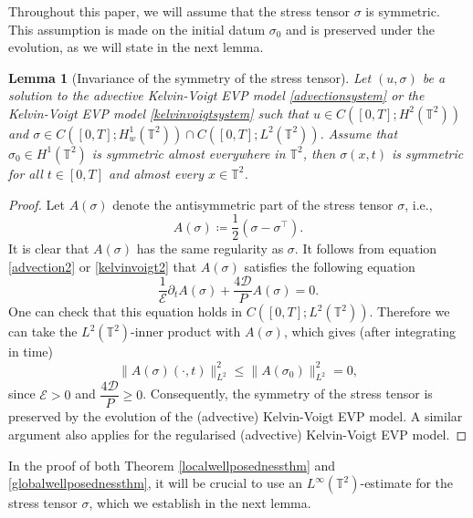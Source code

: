 \documentclass[12pt,a4paper]{article}
\newtheorem{lemma}[theorem]{Lemma}
\theoremstyle{definition}
\theoremstyle{remark}
\numberwithin{equation}{section}
\begin{document}
Throughout this paper, we will assume that the stress tensor $\sigma$ is symmetric. This assumption is made on the initial datum $\sigma_0$ and is preserved under the evolution, as we will state in the next lemma.
\begin{lemma}[Invariance of the symmetry of the stress tensor]
Let $(u,\sigma)$ be a solution to the advective Kelvin-Voigt EVP model \eqref{advectionsystem} or the Kelvin-Voigt EVP model \eqref{kelvinvoigtsystem} such that $u \in C([0,T];H^2 (\mathbb{T}^2))$ and $\sigma \in C([0,T]; H^1_w (\mathbb{T}^2)) \cap C([0,T]; L^2 (\mathbb{T}^2))$. Assume that $\sigma_0 \in H^1 (\mathbb{T}^2)$ is symmetric almost everywhere in $\mathbb{T}^2$, then $\sigma (x,t)$ is symmetric for all $t \in [0,T]$ and almost every $x \in \mathbb{T}^2$.
\end{lemma}
\begin{proof}
Let $A(\sigma)$ denote the antisymmetric part of the stress tensor $\sigma$, i.e.,
\begin{equation}
A (\sigma) \coloneqq \frac{1}{2} (\sigma - \sigma^\top).
\end{equation}
It is clear that $A(\sigma)$ has the same regularity as $\sigma$. It follows from equation \eqref{advection2} or \eqref{kelvinvoigt2} that $A(\sigma)$ satisfies the following equation
\begin{equation}
\dfrac{1}{\mathcal E} \partial_t A(\sigma) + \dfrac{4 \mathcal{D}}{P} A(\sigma)  = 0.
\end{equation}
One can check that this equation holds in $C ([0,T]; L^2 (\mathbb{T}^2))$. Therefore we can take the $L^2 (\mathbb{T}^2)$-inner product with $A(\sigma)$, which gives (after integrating in time) 
\begin{equation}
\lVert A(\sigma) (\cdot, t) \rVert_{L^2}^2 \leq \lVert A(\sigma_0) \rVert_{L^2}^2 = 0,
\end{equation}
since $\mathcal{E} > 0$ and $\dfrac{4 \mathcal{D}}{P} \geq 0$. Consequently, the symmetry of the stress tensor is preserved by the evolution of the (advective) Kelvin-Voigt EVP model. A similar argument also applies for the regularised (advective) Kelvin-Voigt EVP model.
\end{proof}
In the proof of both Theorem \ref{localwellposednessthm} and \ref{globalwellposednessthm}, it will be crucial to use an $L^\infty (\mathbb{T}^2)$-estimate for the stress tensor $\sigma$, which we establish in the next lemma. 
\end{document}
